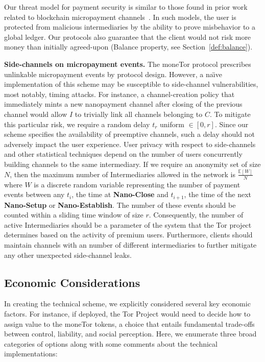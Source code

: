 Our threat model for payment security is similar to those found in prior work related to blockchain micropayment channels~\cite{poon2016bitcoin}.
In such models, the user is protected from malicious intermediaries by the ability to prove misbehavior to a global ledger.
Our protocols also guarantee that the client would not risk more money than initially agreed-upon (Balance property, see Section~\ref{def:balance}).

\medskip \noindent\textbf{Side-channels on micropayment events.}
The moneTor protocol prescribes unlinkable micropayment events by protocol design.
However, a na\"{\i}ve implementation of this scheme may be susceptible to side-channel vulnerabilities, most notably, timing attacks.
For instance, a channel-creation policy that immediately mints a new nanopayment channel after closing of the previous channel would allow $I$ to trivially link all channels belonging to $C$.
To mitigate this particular risk, we require a random delay $t_r$ uniform $\in [0, r]$.
Since our scheme specifies the availability of preemptive channels, such a delay should not adversely impact the user experience.
User privacy with respect to side-channels and other statistical techniques depend on the number of users concurrently building channels to the same intermediary.
If we require an anonymity set of size $N$, then the maximum number of Intermediaries allowed in the network is $\frac{\mathbb{E}[W]}{N}$ where $W$ is a discrete random variable representing the number of payment events between any $t_i$, the time at \textbf{Nano-Close} and $t_{i+1}$, the time of the next \textbf{Nano-Setup} or \textbf{Nano-Establish}.
The number of these events should be counted within a sliding time window of size $r$.
Consequently, the number of active Intermediaries should be a parameter of the system that the Tor project determines based on the activity of premium users.
Furthermore, clients should maintain channels with an number of different intermediaries to further mitigate any other unexpected side-channel leaks.

\subsection{Economic Considerations}
\label{sec:economic_considerations}

In creating the technical scheme, we explicitly considered several key economic factors.
For instance, if deployed, the Tor Project would need to decide how to assign value to the moneTor tokens, a choice that entails fundamental trade-offs between control, liability, and social perception.
Here, we enumerate three broad categories of options along with some comments about the technical implementations:

